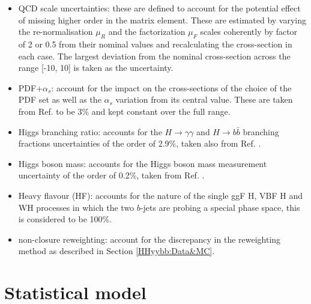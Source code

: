 \begin{itemize}
    \item QCD scale uncertainties: these are defined to account for the potential effect of missing higher order in the matrix element. These are estimated by varying the re-normalisation $\mu_R$ and the factorization $\mu_F$ scales coherently by factor of 2 or 0.5 from their nominal values and recalculating the cross-section in each case. The largest deviation from the nominal cross-section across the \kl range [-10, 10] is taken as the uncertainty.  
    \item PDF+$\alpha_s$: account for the impact on the cross-sections of the choice of the PDF set as well as the $\alpha_{s}$ variation from its central value. These are taken from Ref. \cite{CERN_yellow} to be 3\% and kept constant over the full \kl range.
    \item Higgs branching ratio: accounts for the $H\to\gamma\gamma$ and $H\to b\bar{b}$ branching fractions uncertainties of the order of 2.9\%, taken also from Ref. \cite{CERN_yellow}. 
    \item Higgs boson mass: accounts for the Higgs boson mass measurement uncertainty of the order of 0.2\%, taken from Ref. \cite{Mass}. 
    \item Heavy flavour (HF): accounts for the nature of the single ggF H, VBF H and WH processes in which the two $b$-jets are probing a special phase space, this is considered to be 100\%.
    \item non-closure \kl reweighting: account for the discrepancy in the \kl reweighting method as described in Section \ref{HHyybb:Data&MC}. 
\end{itemize}

\section{Statistical model}
\label{HHyybb:Stat}

